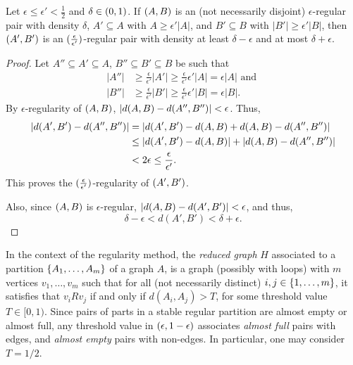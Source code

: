         \begin{lemma} \label{lem:regularity_is_transitive}
            Let $\epsilon \leq \epsilon' < \frac{1}{2}$ and $\delta \in ( 0, 1 )$.
            If $( A,B )$ is an (not necessarily disjoint) $\epsilon$-regular pair with density $\delta$, $A' \subseteq A$ with
            $A \geq \epsilon' |A|$, and $B' \subseteq B$ with $|B'| \geq \epsilon' |B|$, then $( A', B' )$ is an
            $( \frac{\epsilon}{\epsilon'} )$-regular pair with density at least $\delta - \epsilon$ and at most $\delta + \epsilon$.
            \begin{proof}
                Let $A'' \subseteq A' \subseteq A$, $B'' \subseteq B' \subseteq B$ be such that
                \begin{align*}
                    |A''| & \geq \frac{\epsilon}{\epsilon'} |A'| \geq \frac{\epsilon}{\epsilon'} \epsilon' |A| = \epsilon |A|
                    \text{ and } \\
                    |B''| & \geq \frac{\epsilon}{\epsilon'} |B'| \geq \frac{\epsilon}{\epsilon'} \epsilon' |B| = \epsilon |B|.
                \end{align*}
                By $\epsilon$-regularity of $( A,B )$, $| d(A,B) - d(A'',B'') | < \epsilon$.
                Thus,
                \begin{align*}
                    | d(A',B') - d(A'',B'') |
                        & = | d(A',B') - d(A,B) + d(A,B) - d(A'',B'') | \\
                        & \leq | d(A',B') - d(A,B) | + | d(A,B) - d(A'',B'') | \\
                        & < 2 \epsilon \leq \frac{\epsilon}{\epsilon'}.
                \end{align*}
                This proves the $( \frac{\epsilon}{\epsilon'} )$-regularity of $( A',B' )$.

                Also, since $( A,B )$ is $\epsilon$-regular, $| d(A,B) - d(A',B') | < \epsilon$,
                and thus,
                \[
                    \delta - \epsilon < d(A',B') < \delta + \epsilon.
                \]
            \end{proof}
        \end{lemma}

        In the context of the regularity method, the \emph{reduced graph} $H$ associated to a partition
        $\{ A_1, \dots, A_m \}$ of a graph $A$, is a graph (possibly with loops) with $m$ vertices $v_1, \dots, v_m$
        such that for all (not necessarily distinct) $i,j \in \{ 1, \dots, m \}$, it satisfies that $v_i R v_j$
        if and only if $d(A_i, A_j) > T$, for some threshold value $T \in [0,1)$.
        Since pairs of parts in a stable regular partition are almost empty or almost full, any threshold value
        in $( \epsilon, 1 - \epsilon )$ associates \emph{almost full} pairs with edges, and \emph{almost empty}
        pairs with non-edges.
        In particular, one may consider $T = 1/2$.

